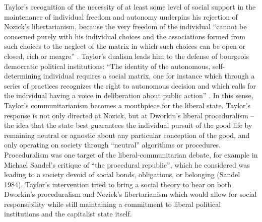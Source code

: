 \documentclass[12pt,oneside]{memoir}
\begin{document}
	Taylor's recognition of the necessity of at least some level of social support in the maintenance of individual freedom and autonomy underpins his rejection of Nozick's libertarianism, because the very freedom of the individual ``cannot be concerned purely with his individual choices and the associations formed from such choices to the neglect of the matrix in which such choices can be open or closed, rich or meagre'' \citep[207]{Taylor1985}. Taylor's dualism leads him to the defense of bourgeois democratic political institutions: ``The identity of the autonomous, self-determining individual requires a social matrix, one for instance which through a series of practices recognizes the right to autonomous decision and which calls for the individual having a voice in deliberation about public action'' \citep[209]{Taylor1985}. In this sense, Taylor's communitarianism becomes a mouthpiece for the liberal state. Taylor's response is not only directed at Nozick, but at Dworkin's liberal proceduralism -- the idea that the state best guarantees the individual pursuit of the good life by remaining neutral or agnostic about any particular conception of the good, and only operating on society through ``neutral'' algorithms or procedures. Proceduralism was one target of the liberal-communitarian debate, for example in Michael Sandel's critique of ``the procedural republic'', which he considered was leading to a society devoid of social bonds, obligations, or belonging (Sandel 1984). Taylor's intervention tried to bring a social theory to bear on both Dworkin's proceduralism and Nozick's libertarianism which would allow for social responsibility while still maintaining a commitment to liberal political institutions and the capitalist state itself.
	
\end{document}
